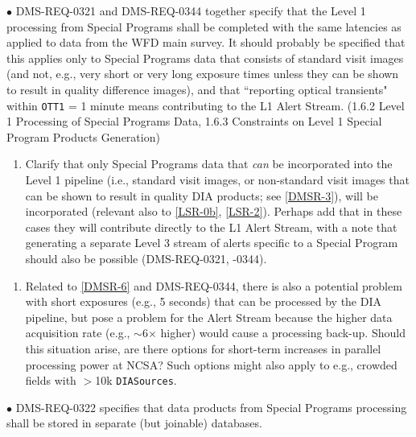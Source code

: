 \documentclass[DM,lsstdraft,toc]{lsstdoc}
\begin{document}
$\bullet$ DMS-REQ-0321 and DMS-REQ-0344 together specify that the Level 1 processing from Special Programs shall be completed with the same latencies as applied to data from the WFD main survey. It should probably be specified that this applies only to Special Programs data that consists of standard visit images (and not, e.g., very short or very long exposure times unless they can be shown to result in quality difference images), and that ``reporting optical transients" within {\tt OTT1} = 1 minute means contributing to the L1 Alert Stream. (1.6.2 Level 1 Processing of Special Programs Data, 1.6.3 Constraints on Level 1 Special Program Products Generation)
\begin{enumerate}[topsep=-10pt,after=\vspace{10pt},label= \textbf{Concern \Roman*.},resume] \item \label{DMSR-6} Clarify that only Special Programs data that {\it can} be incorporated into the Level 1 pipeline (i.e., standard visit images, or non-standard visit images that can be shown to result in quality DIA products; see \ref{DMSR-3}), will be incorporated (relevant also to \ref{LSR-0b}, \ref{LSR-2}). Perhaps add that in these cases they will contribute directly to the L1 Alert Stream, with a note that generating a separate Level 3 stream of alerts specific to a Special Program should also be possible (DMS-REQ-0321, -0344). \end{enumerate}

\begin{enumerate}[topsep=-10pt,after=\vspace{10pt},label= \textbf{Concern \Roman*.},resume] \item \label{DMSR-6b} Related to \ref{DMSR-6} and DMS-REQ-0344, there is also a potential problem with short exposures (e.g., 5 seconds) that can be processed by  the DIA pipeline, but pose a problem for the Alert Stream because the higher data acquisition rate (e.g., $\sim$6$\times$ higher) would cause a processing back-up. Should this situation arise, are there options for short-term increases in parallel processing power at NCSA? Such options might also apply to e.g., crowded fields with $>$10k {\tt DIASources}. \end{enumerate}

$\bullet$ DMS-REQ-0322 specifies that data products from Special Programs processing shall be stored in separate (but joinable) databases.
\end{document}
